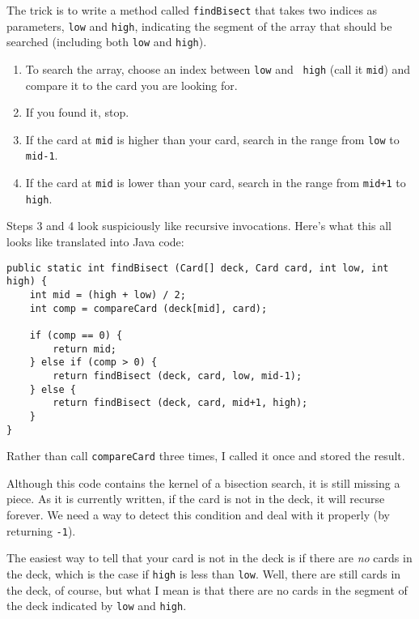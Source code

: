 \documentclass{book}
\begin{document}

The trick is to write a method called {\tt findBisect} that takes
two indices as parameters, {\tt low} and {\tt high}, indicating the
segment of the array that should be searched (including both
{\tt low} and {\tt high}).

\begin{enumerate}

\item To search the array, choose an index between {\tt low} and {\tt
high} (call it {\tt mid}) and compare it to the card you are looking
for.

\item If you found it, stop.

\item If the card at {\tt mid} is higher than your card, search
in the range from {\tt low} to {\tt mid-1}.

\item If the card at {\tt mid} is lower than your card, search
in the range from {\tt mid+1} to {\tt high}.

\end{enumerate}

Steps 3 and 4 look suspiciously like recursive invocations.  Here's
what this all looks like translated into Java code:

\begin{verbatim}
public static int findBisect (Card[] deck, Card card, int low, int high) {
    int mid = (high + low) / 2;
    int comp = compareCard (deck[mid], card);

    if (comp == 0) {
        return mid;
    } else if (comp > 0) {
        return findBisect (deck, card, low, mid-1);
    } else {
        return findBisect (deck, card, mid+1, high);
    }
}
\end{verbatim}

Rather than call {\tt compareCard} three times, I called it once
and stored the result.

Although this code contains the kernel of a bisection search, it
is still missing a piece.  As it is currently written,
if the card is not in the deck, it will recurse forever.  We
need a way to detect this condition and deal with it properly
(by returning {\tt -1}).


The easiest way to tell that your card is not in the deck
is if there are {\em no} cards in the deck, which is the
case if {\tt high} is less than {\tt low}.  Well, there are
still cards in the deck, of course, but what I mean is that
there are no cards in the segment of the deck indicated by
{\tt low} and {\tt high}.
\end{document}
